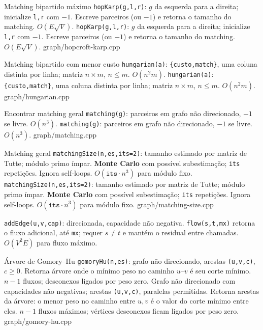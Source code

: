 \templateentry
{Matching bipartido máximo}
{\texttt{hopKarp(g,l,r)}: $g$ da esquerda para a direita; inicialize \texttt{l,r} com $-1$. Escreve parceiros (ou $-1$) e retorna o tamanho do matching. $O(E\sqrt V)$.}
{\texttt{hopKarp(g,l,r)}: $g$ da esquerda para a direita; inicialize \texttt{l,r} com $-1$. Escreve parceiros (ou $-1$) e retorna o tamanho do matching. $O(E\sqrt V)$.}
{graph/hopcroft-karp.cpp}

\templateentry
{Matching bipartido com menor custo}
{\texttt{hungarian(a)}: \texttt{\{custo,match\}}, uma coluna distinta por linha; matriz $n\times m$, $n\le m$. $O(n^2m)$.}
{\texttt{hungarian(a)}: \texttt{\{custo,match\}}, uma coluna distinta por linha; matriz $n\times m$, $n\le m$. $O(n^2m)$.}
{graph/hungarian.cpp}

\templateentry
{Encontrar matching geral}
{\texttt{matching(g)}: parceiros em grafo não direcionado, $-1$ se livre. $O(n^3)$.}
{\texttt{matching(g)}: parceiros em grafo não direcionado, $-1$ se livre. $O(n^3)$.}
{graph/matching.cpp}

\ifextended

\templateentry
{Matching geral}
{\texttt{matchingSize(n,es,its=2)}: tamanho estimado por matriz de Tutte; módulo primo ímpar. \textbf{Monte Carlo} com possível subestimação; \texttt{its} repetições. Ignora self-loops. $O(\mathtt{its}\cdot n^3)$ para módulo fixo.}
{\texttt{matchingSize(n,es,its=2)}: tamanho estimado por matriz de Tutte; módulo primo ímpar. \textbf{Monte Carlo} com possível subestimação; \texttt{its} repetições. Ignora self-loops. $O(\mathtt{its}\cdot n^3)$ para módulo fixo.}
{graph/matching-size.cpp}

\fi

{\texttt{addEdge(u,v,cap)}: direcionada, capacidade não negativa.
\texttt{flow(s,t,mx)} retorna o fluxo adicional, até \texttt{mx}; requer $s\ne t$ e mantém o residual entre chamadas. $O(V^2E)$ para fluxo máximo.
}
{}

\templateentry
{Árvore de Gomory--Hu}
{\texttt{gomoryHu(n,es)}: grafo não direcionado, arestas \texttt{(u,v,c)}, $c\ge0$. Retorna árvore onde o mínimo peso no caminho $u$--$v$ é seu corte mínimo. $n-1$ fluxos; desconexos ligados por peso zero.}
{Grafo não direcionado com capacidades não negativas; arestas \texttt{(u,v,c)}, paralelas permitidas. Retorna arestas da árvore: o menor peso no caminho entre $u,v$ é o valor do corte mínimo entre eles. $n-1$ fluxos máximos; vértices desconexos ficam ligados por peso zero.}
{graph/gomory-hu.cpp}


